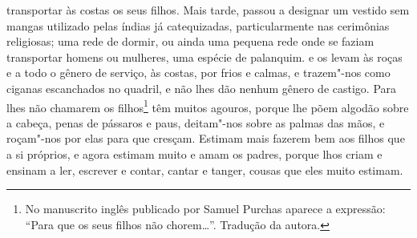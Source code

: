 \begin{linenumbers}
{transportar às costas os seus filhos. Mais tarde, passou a designar um
vestido sem mangas utilizado pelas índias já catequizadas,
particularmente nas cerimônias religiosas; uma rede de dormir, ou ainda
uma pequena rede onde se faziam transportar homens ou mulheres, uma
espécie de palanquim.} e os levam às roças e a todo o gênero
de serviço, às costas, por frios e calmas, e trazem"-nos como ciganas
escanchados no quadril, e não lhes dão nenhum gênero de castigo. Para
lhes não chamarem os filhos\footnote{ No manuscrito inglês publicado
por Samuel Purchas aparece a expressão: ``Para que os seus filhos não
chorem\ldots{}''. Tradução da autora.} têm muitos agouros, porque lhe põem
algodão sobre a cabeça, penas de pássaros e paus, deitam"-nos sobre as
palmas das mãos, e roçam"-nos por elas para que cresçam. Estimam mais
fazerem bem aos filhos que a si próprios, e agora estimam muito e amam
os padres, porque lhos criam e ensinam a ler, escrever e contar, cantar
e tanger, cousas que eles muito estimam.


\end{linenumbers}
